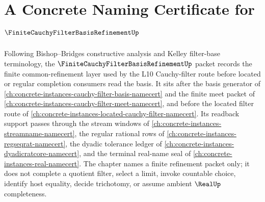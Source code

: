 \chapter{A Concrete Naming Certificate for $\FiniteCauchyFilterBasisRefinementUp$}
\label{ch:concrete-instances-finite-cauchy-filter-basis-refinement-namecert}

Following Bishop--Bridges constructive analysis and Kelley filter-base terminology, the $\FiniteCauchyFilterBasisRefinementUp$ packet records the finite common-refinement layer used by the L10 Cauchy-filter route before located or regular completion consumers read the basis. It sits after the basis generator of \autoref{ch:concrete-instances-cauchy-filter-basis-namecert} and the finite meet packet of \autoref{ch:concrete-instances-cauchy-filter-meet-namecert}, and before the located filter route of \autoref{ch:concrete-instances-located-cauchy-filter-namecert}. Its readback support passes through the stream windows of \autoref{ch:concrete-instances-streamname-namecert}, the regular rational rows of \autoref{ch:concrete-instances-regseqrat-namecert}, the dyadic tolerance ledger of \autoref{ch:concrete-instances-dyadicratcore-namecert}, and the terminal real-name seal of \autoref{ch:concrete-instances-real-namecert}. The chapter names a finite refinement packet only; it does not complete a quotient filter, select a limit, invoke countable choice, identify host equality, decide trichotomy, or assume ambient $\RealUp$ completeness.

